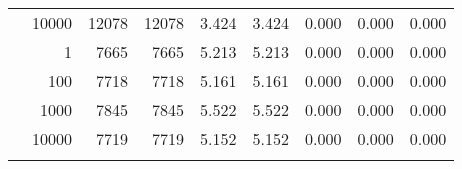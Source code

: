 \begin{table}
\begin{tabular}{rrrrrrrrr}
	            
					 &  
					 
					\multirow{ 1 }{*}{ 10000 } &
					
						
							    
							     12078  & 12078  
	                           & 3.424 & 3.424 & 0.000
	                           & 0.000 & 0.000  \\
	                
	            
	        
				\noalign{\smallskip}\hline
				\multirow{ 4 }{*}{ 500000 } &
				
					
					 
					\multirow{ 1 }{*}{ 1 } &
					
						
							    
							     7665  & 7665  
	                           & 5.213 & 5.213 & 0.000
	                           & 0.000 & 0.000  \\
	                
	            
					 &  
					 
					\multirow{ 1 }{*}{ 100 } &
					
						
							    
							     7718  & 7718  
	                           & 5.161 & 5.161 & 0.000
	                           & 0.000 & 0.000  \\
	                
	            
					 &  
					 
					\multirow{ 1 }{*}{ 1000 } &
					
						
							    
							     7845  & 7845  
	                           & 5.522 & 5.522 & 0.000
	                           & 0.000 & 0.000  \\
	                
	            
					 &  
					 
					\multirow{ 1 }{*}{ 10000 } &
					
						
							    
							     7719  & 7719  
	                           & 5.152 & 5.152 & 0.000
	                           & 0.000 & 0.000  \\
	                
	            
	        
				\noalign{\smallskip}\hline
				\multirow{ 4 }{*}{ 1000000 } &
				
					
					 

\end{tabular}
\end{table}
